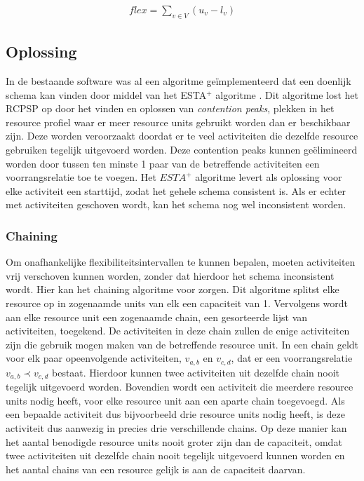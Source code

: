 \begin{align}
\label{eq:flex1}
    flex = \sum_{v \in V} (u_v - l_v)
\end{align}

\subsection{Oplossing}
\label{subsec:probleemoplossing}
In de bestaande software was al een algoritme ge\"implementeerd dat een doenlijk schema kan vinden door middel van het ESTA$^+$ algoritme \cite{ronaldevers2010}.
Dit algoritme lost het RCPSP op door het vinden en oplossen van \emph{contention peaks}, plekken in het resource profiel waar er meer resource units gebruikt worden dan er beschikbaar zijn. Deze worden veroorzaakt doordat er te veel activiteiten die dezelfde resource gebruiken tegelijk uitgevoerd worden. Deze contention peaks kunnen ge\"elimineerd worden door tussen ten minste 1 paar van de betreffende activiteiten een voorrangsrelatie toe te voegen. Het $ESTA^+$ algoritme levert als oplossing voor elke activiteit een starttijd, zodat het gehele schema consistent is. Als er echter met activiteiten geschoven wordt, kan het schema nog wel inconsistent worden.

\subsubsection{Chaining}
\label{subsubsec:chainingoplossing}
Om onafhankelijke flexibiliteitsintervallen te kunnen bepalen, moeten activiteiten vrij verschoven kunnen worden, zonder dat hierdoor het schema inconsistent wordt. Hier kan het chaining algoritme voor zorgen. Dit algoritme splitst elke resource op in zogenaamde units van elk een capaciteit van 1. Vervolgens wordt aan elke resource unit een zogenaamde chain, een gesorteerde lijst van activiteiten, toegekend. De activiteiten in deze chain zullen de enige activiteiten zijn die gebruik mogen maken van de betreffende resource unit. In een chain geldt voor elk paar opeenvolgende activiteiten, $v_{a,b}$ en $v_{c,d}$, dat er een voorrangsrelatie $v_{a,b} \prec v_{c,d}$ bestaat. Hierdoor kunnen twee activiteiten uit dezelfde chain nooit tegelijk uitgevoerd worden. Bovendien wordt een activiteit die meerdere resource units nodig heeft, voor elke resource unit aan een aparte chain toegevoegd. Als een bepaalde activiteit dus bijvoorbeeld drie resource units nodig heeft, is deze activiteit dus aanwezig in precies drie verschillende chains. Op deze manier kan het aantal benodigde resource units nooit groter zijn dan de capaciteit, omdat twee activiteiten uit dezelfde chain nooit tegelijk uitgevoerd kunnen worden en het aantal chains van een resource gelijk is aan de capaciteit daarvan.

